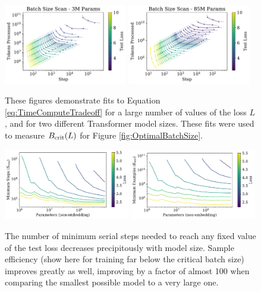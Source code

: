 \documentclass[english]{article}
\begin{document}
\begin{figure}
\noindent \centering{} 
\includegraphics[width=0.48\textwidth]{BatchParetoFronts3M} 
\includegraphics[width=0.48\textwidth]{BatchParetoFronts85M}
 \caption[Batch size scans]{These figures demonstrate fits to Equation \eqref{eq:TimeComputeTradeoff} for a large number of values of the loss $L$, and for two different Transformer model sizes.  These fits were used to measure $B_{\rm crit}(L)$ for Figure \ref{fig:OptimalBatchSize}.  \label{fig:BatchPareto}}
\end{figure}

\begin{figure}
\noindent \centering{}
\includegraphics[width=0.49\textwidth]{SampleEfficiencystep_min}
\includegraphics[width=0.49\textwidth]{SampleEfficiencyexamples_min}
\caption[Another look at sample efficiency]{The number of minimum serial steps needed to reach any fixed value of the test loss decreases precipitously with model size.  Sample efficiency (show here for training far below the critical batch size) improves greatly as well, improving by a factor of almost 100 when comparing the smallest possible model to a very large one.   \label{fig:SampleEfficiency}}
\end{figure} 
\end{document}

